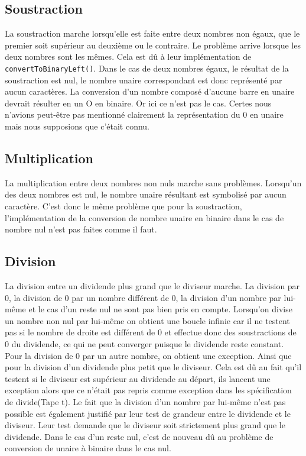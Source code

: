 \documentclass[a4paper,11pt]{article}
\begin{document}
    \subsection{Soustraction}

La soustraction marche lorsqu'elle est faite entre deux nombres non égaux, que le premier soit supérieur au deuxième ou le contraire. Le problème arrive lorsque les deux nombres sont les mêmes. Cela est dû à leur implémentation de \texttt{convertToBinaryLeft()}.
Dans le cas de deux nombres égaux, le résultat de la soustraction est nul, le nombre unaire correspondant est donc représenté par aucun caractères. La conversion d'un nombre composé d'aucune barre en unaire devrait résulter en un O en binaire. Or ici ce n'est pas le cas. Certes nous n'avions peut-être pas mentionné clairement la représentation du 0 en unaire mais nous supposions que c'était connu.

    \subsection{Multiplication}

La multiplication entre deux nombres non nuls marche sans problèmes.
Lorsqu'un des deux nombres est nul, le nombre unaire résultant est symbolisé par aucun caractère. C'est donc le même problème que pour la soustraction, l'implémentation de la conversion de nombre unaire en binaire dans le cas de nombre nul n'est pas faites comme il faut.

    \subsection{Division}

La division entre un dividende plus grand que le diviseur marche. La division par 0, la division de 0 par un nombre différent de 0, la division d'un nombre par lui-même et le cas d'un reste nul ne sont pas bien pris en compte. 
Lorsqu'on divise un nombre non nul par lui-même on obtient une boucle infinie car il ne testent pas si le nombre de droite est différent de 0 et effectue donc des soustractions de 0 du dividende, ce qui ne peut converger puisque le dividende reste constant.
Pour la division de 0 par un autre nombre, on obtient une exception. Ainsi que pour la division d'un dividende plus petit que le diviseur. Cela est dû au fait qu'il testent si le diviseur est supérieur au dividende au départ, ils lancent une exception alors que ce n'était pas repris comme exception dans les spécification de divide(Tape t).
Le fait que la division d'un nombre par lui-même n'est pas possible est également justifié par leur test de grandeur entre le dividende et le diviseur. Leur test demande que le diviseur soit strictement plus grand que le dividende.
Dans le cas d'un reste nul, c'est de nouveau dû au problème de conversion de unaire à binaire dans le cas nul.
\end{document}
